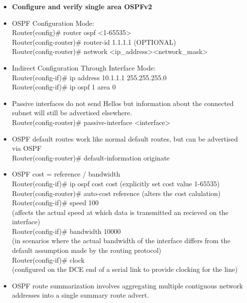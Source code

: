 \documentclass{article}
\begin{document}
\begin{itemize}
  \item \textbf{Configure and verify single area OSPFv2}
  	\item[] OSPF Configuration Mode:\\
  		Router(config)\# router ospf \textless 1-65535\textgreater\\
  		Router(config-router)\# router-id 1.1.1.1 (OPTIONAL)\\
  		Router(config-router)\# network \textless ip\_address\textgreater \textless network\_mask\textgreater
  	\item[] Indirect Configuration Through Interface Mode:\\
  		Router(config-if)\# ip address 10.1.1.1 255.255.255.0\\
  		Router(config-if)\# ip ospf 1 area 0
  	\item[] Passive interfaces do not send Hellos but information about the connected subnet will still be advertised elsewhere.\\
  		Router(config-router)\# passive-interface \textless interface\textgreater
  	\item[] OSPF default routes work like normal default routes, but can be advertised via OSPF\\
  		Router(config-router)\# default-information originate\\
  	\item[] OSPF cost = reference / bandwidth\\
  		Router(config-if)\# ip ospf cost cost (explicitly set cost value 1-65535)\\
  		Router(config-router)\# auto-cost reference (alters the cost calulation)\\
  		Router(config-if)\# speed 100\\
  		(affects the actual speed at which data is transmitted an recieved on the interface)\\
  		Router(config-if)\# bandwidth 10000\\
  		(in scenarios where the actual bandwidth of the interface differs from the default assumption made by the routing protocol)\\
  		Router(config-if)\# clock\\
  		(configured on the DCE end of a serial link to provide clocking for the line)\\
  	\item[] OSPF route summarization involves aggregating multiple contiguous network addresses into a single summary route advert.\\

\end{itemize}
\end{document}
